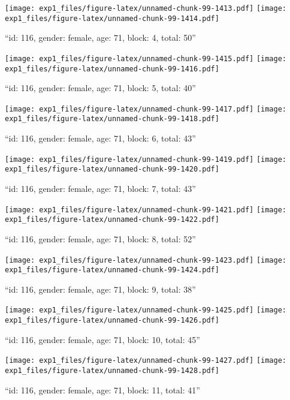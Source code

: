 \documentclass[,]{article}
\begin{document}
\texttt{[image: exp1\_files/figure-latex/unnamed-chunk-99-1413.pdf]}
\texttt{[image: exp1\_files/figure-latex/unnamed-chunk-99-1414.pdf]}

\newpage
[1] 

``id: 116, gender: female, age: 71, block: 4, total: 50''

\texttt{[image: exp1\_files/figure-latex/unnamed-chunk-99-1415.pdf]}
\texttt{[image: exp1\_files/figure-latex/unnamed-chunk-99-1416.pdf]}

\newpage
[1] 

``id: 116, gender: female, age: 71, block: 5, total: 40''

\texttt{[image: exp1\_files/figure-latex/unnamed-chunk-99-1417.pdf]}
\texttt{[image: exp1\_files/figure-latex/unnamed-chunk-99-1418.pdf]}

\newpage
[1] 

``id: 116, gender: female, age: 71, block: 6, total: 43''

\texttt{[image: exp1\_files/figure-latex/unnamed-chunk-99-1419.pdf]}
\texttt{[image: exp1\_files/figure-latex/unnamed-chunk-99-1420.pdf]}

\newpage
[1] 

``id: 116, gender: female, age: 71, block: 7, total: 43''

\texttt{[image: exp1\_files/figure-latex/unnamed-chunk-99-1421.pdf]}
\texttt{[image: exp1\_files/figure-latex/unnamed-chunk-99-1422.pdf]}

\newpage
[1] 

``id: 116, gender: female, age: 71, block: 8, total: 52''

\texttt{[image: exp1\_files/figure-latex/unnamed-chunk-99-1423.pdf]}
\texttt{[image: exp1\_files/figure-latex/unnamed-chunk-99-1424.pdf]}

\newpage
[1] 

``id: 116, gender: female, age: 71, block: 9, total: 38''

\texttt{[image: exp1\_files/figure-latex/unnamed-chunk-99-1425.pdf]}
\texttt{[image: exp1\_files/figure-latex/unnamed-chunk-99-1426.pdf]}

\newpage
[1] 

``id: 116, gender: female, age: 71, block: 10, total: 45''

\texttt{[image: exp1\_files/figure-latex/unnamed-chunk-99-1427.pdf]}
\texttt{[image: exp1\_files/figure-latex/unnamed-chunk-99-1428.pdf]}

\newpage
[1] 

``id: 116, gender: female, age: 71, block: 11, total: 41''
\end{document}
